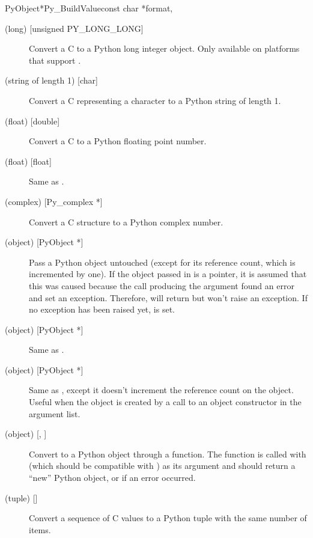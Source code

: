 \begin{cfuncdesc}{PyObject*}{Py_BuildValue}{const char *format,
                                            \moreargs}
\begin{description}
    \item[ (long) {[unsigned PY_LONG_LONG]}]
    Convert a C  to a Python long integer object.
    Only available on platforms that support .

    \item[ (string of length 1) {[char]}]
    Convert a C  representing a character to a Python
    string of length 1.

    \item[ (float) {[double]}]
    Convert a C  to a Python floating point number.

    \item[ (float) {[float]}]
    Same as .

    \item[ (complex) {[Py_complex *]}]
    Convert a C  structure to a Python complex
    number.

    \item[ (object) {[PyObject *]}]
    Pass a Python object untouched (except for its reference count,
    which is incremented by one).  If the object passed in is a
    \NULL{} pointer, it is assumed that this was caused because the
    call producing the argument found an error and set an exception.
    Therefore,  will return \NULL{} but
    won't raise an exception.  If no exception has been raised yet,
     is set.

    \item[ (object) {[PyObject *]}]
    Same as .

    \item[ (object) {[PyObject *]}]
    Same as , except it doesn't increment the reference count
    on the object.  Useful when the object is created by a call to an
    object constructor in the argument list.

    \item[ (object) {[, ]}]
    Convert  to a Python object through a
     function.  The function is called with
     (which should be compatible with ) as
    its argument and should return a ``new'' Python object, or \NULL{}
    if an error occurred.

    \item[ (tuple) {[]}]
    Convert a sequence of C values to a Python tuple with the same
    number of items.


\end{description}
\end{cfuncdesc}
